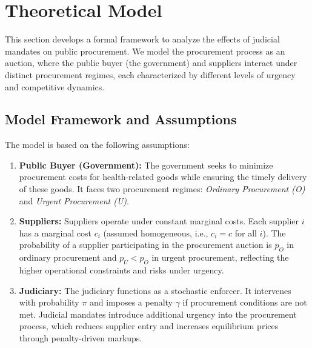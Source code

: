\section{Theoretical Model}
This section develops a formal framework to analyze the effects of judicial mandates on public procurement. We model the procurement process as an auction, where the public buyer (the government) and suppliers interact under distinct procurement regimes, each characterized by different levels of urgency and competitive dynamics.

\subsection{Model Framework and Assumptions}
The model is based on the following assumptions:
\begin{enumerate}
    \item \textbf{Public Buyer (Government):} The government seeks to minimize procurement costs for health-related goods while ensuring the timely delivery of these goods. It faces two procurement regimes: \textit{Ordinary Procurement (O)} and \textit{Urgent Procurement (U)}.
    \item \textbf{Suppliers:} Suppliers operate under constant marginal costs. Each supplier \(i\) has a marginal cost \(c_i\) (assumed homogeneous, i.e., \(c_i = c\) for all \(i\)). The probability of a supplier participating in the procurement auction is \(p_O\) in ordinary procurement and \(p_U < p_O\) in urgent procurement, reflecting the higher operational constraints and risks under urgency.
    \item \textbf{Judiciary:} The judiciary functions as a stochastic enforcer. It intervenes with probability \(\pi\) and imposes a penalty \(\gamma\) if procurement conditions are not met. Judicial mandates introduce additional urgency into the procurement process, which reduces supplier entry and increases equilibrium prices through penalty-driven markups.
\end{enumerate}


